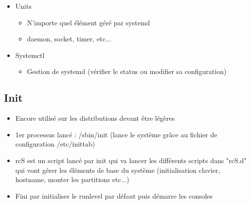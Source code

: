 \documentclass[a4paper]{article}
\begin{document}
\begin{itemize}[label = \textbullet, font = \Large]
\begin{itemize}[label=, font=\scriptsize]
        \end{itemize}
        \item Units
        \begin{itemize}[label=, font=\scriptsize] 
          \item N'importe quel élément géré par systemd
          \item daemon, socket, timer, etc...
        \end{itemize}
        \item Systemctl
        \begin{itemize}[label=, font=\scriptsize] 
          \item Gestion de systemd (vérifier le status ou modifier sa configuration)
        \end{itemize}
      \end{itemize}

      \subsection{Init}
      \begin{itemize}[label = \textbullet, font = \Large]
        \item Encore utilisé sur les distributions devant être légères
        \item 1er processus lancé : /sbin/init (lance le système grâce au fichier de configuration /etc/inittab)
        \item rcS est un script lancé par init qui va lancer les différents scripts dans "rcS.d" qui vont gérer les éléments de base du système (initialisation clavier, hostname, monter les partitions etc...)
        \item Fini par initialiser le runlevel par défaut puis démarre les consoles
      \end{itemize}
\end{document}
